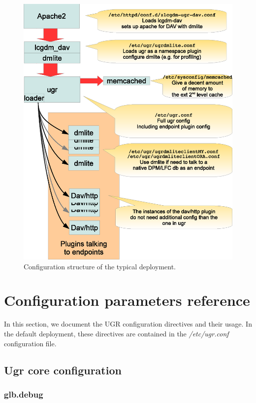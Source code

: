 \documentclass[12pt]{article} %
\begin{document}
\begin{figure}
  \begin{center}
    \includegraphics[width=30pc]{fullconfig.eps}
  \end{center}
  \caption{\label{fig_fullconfig}Configuration structure of the typical deployment.}
\end{figure}

\section{Configuration parameters reference}
In this section, we document the UGR configuration directives and their usage. In the default deployment, these directives are contained in the \textit{/etc/ugr.conf} configuration file.

\subsection{Ugr core configuration}

\subsubsection{glb.debug}
\end{document}
